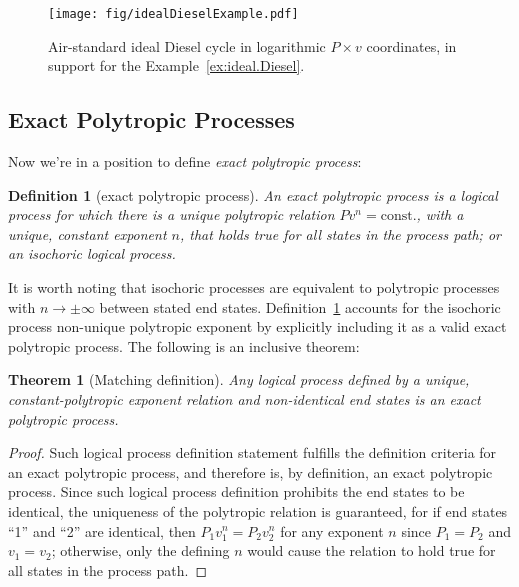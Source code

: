 \documentclass[fleqn,11pt]{SelfArx}
\newtheorem{theorem}{Theorem}
\newtheorem{definition}{Definition}
\begin{document}
    \begin{figure}[ht]
        \centering
        \texttt{[image: fig/idealDieselExample.pdf]}
        \caption{Air-standard ideal Diesel cycle in  logarithmic  $P\times  v$  coordinates,  in
            support for the Example~\ref{ex:ideal.Diesel}.}
        \label{fig:cycle.Diesel}
    \end{figure}

    \subsection{Exact Polytropic Processes}

    Now we're in a position to define \emph{exact polytropic process}:

    \begin{definition}[exact polytropic process]\label{def:exact.poly.proc}
        An exact polytropic process is a logical process for which there is a unique  polytropic
        relation $Pv^n = \mbox{const.}$, with a unique, constant exponent $n$, that  holds  true
        for all states in the process path; or an isochoric logical process.
    \end{definition}

    It is worth noting that isochoric processes are equivalent to polytropic processes  with  $n
    \to \pm\infty$ between stated end states. Definition~\ref{def:exact.poly.proc} accounts  for
    the isochoric process non-unique polytropic exponent by explicitly including it as  a  valid
    exact polytropic process. The following is an inclusive theorem:

    \begin{theorem}[Matching definition]\label{theo:matching.def}
        Any logical process defined by  a  unique,  constant-polytropic  exponent  relation  and
        non-identical end states is an exact polytropic process.
    \end{theorem}

    \begin{proof}
        Such logical process definition statement fulfills the definition criteria for an  exact
        polytropic process, and therefore is, by definition, an exact polytropic process.  Since
        such logical process definition prohibits the end states to be identical, the uniqueness
        of the polytropic relation is  guaranteed,  for  if  end  states  ``1''  and  ``2''  are
        identical, then $P_1v_1^n = P_2v_2^n$ for any exponent $n$ since $P_1 = P_2$ and $v_1  =
        v_2$; otherwise, only the defining $n$ would cause the relation to  hold  true  for  all
        states in the process path.
    \end{proof}
\end{document}
